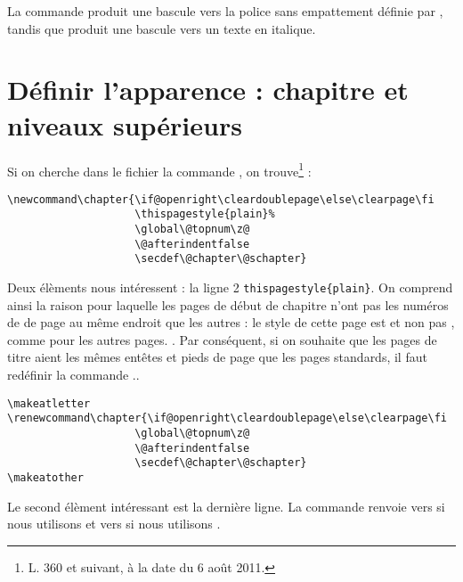 La commande  produit une bascule vers la police sans empattement définie par , tandis que  produit une bascule vers un texte en italique.

\section{Définir l'apparence : chapitre et niveaux supérieurs}

Si on cherche dans le fichier  la commande , on trouve\footnote{L. 360 et suivant, à la date du 6 août 2011.} :

\begin{verbatim}
\newcommand\chapter{\if@openright\cleardoublepage\else\clearpage\fi
                    \thispagestyle{plain}%
                    \global\@topnum\z@
                    \@afterindentfalse
                    \secdef\@chapter\@schapter}
\end{verbatim}

Deux élèments nous intéressent : la ligne 2 \verb|thispagestyle{plain}|. On comprend ainsi la raison pour laquelle les  pages de début de chapitre n'ont pas les numéros de de page au même endroit que les autres : le style de cette page est  et non pas , comme pour les autres pages. . Par conséquent, si on souhaite que les pages de titre aient les mêmes entêtes et pieds de page que les pages standards, il faut redéfinir la commande \commande{\chapter}.\label{entetechapter}.

\begin{verbatim}
\makeatletter
\renewcommand\chapter{\if@openright\cleardoublepage\else\clearpage\fi
                    \global\@topnum\z@
                    \@afterindentfalse
                    \secdef\@chapter\@schapter}
\makeatother
\end{verbatim}

Le second élèment intéressant est la dernière ligne. La commande  renvoie vers  si nous utilisons  et vers  si nous utilisons .

